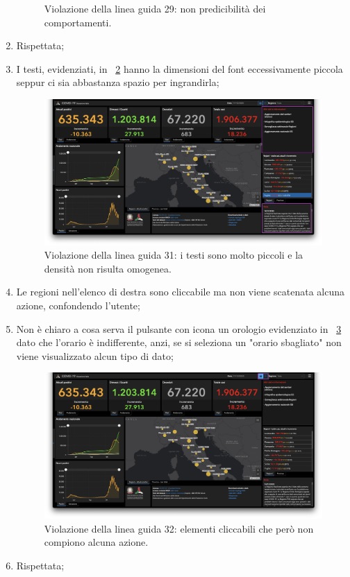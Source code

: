 \begin{enumerate}
\begin{figure}[H]
            \caption{Violazione della linea guida 29: non predicibilità dei comportamenti.}
            \label{fig:guidelines-violations-10}
        \end{figure}
    \item Rispettata;
    \item I testi, evidenziati, in ~\ref{fig:guidelines-violations-11} hanno la dimensioni del font eccessivamente piccola seppur ci sia abbastanza spazio per ingrandirla;
        \begin{figure}[H]
            \centering
            \includegraphics[width=0.5\columnwidth]{../../../assets/images/verifica-risorse-esistenti/guidelines_violations_13.png}
            \caption{Violazione della linea guida 31: i testi sono molto piccoli e la densità non risulta omogenea.}
            \label{fig:guidelines-violations-11}
        \end{figure}
    \item Le regioni nell'elenco di destra sono cliccabile ma non viene scatenata alcuna azione, confondendo l'utente;
    \item Non è chiaro a cosa serva il pulsante con icona un orologio evidenziato in ~\ref{fig:guidelines-violations-12} dato che l'orario è indifferente, anzi, se si seleziona un "orario sbagliato" non viene visualizzato alcun tipo di dato;
        \begin{figure}[H]
            \centering
            \includegraphics[width=0.5\columnwidth]{../../../assets/images/verifica-risorse-esistenti/guidelines_violations_14.png}
            \caption{Violazione della linea guida 32: elementi cliccabili che però non compiono alcuna azione.}
            \label{fig:guidelines-violations-12}
        \end{figure}
    \item Rispettata;

\end{enumerate}
